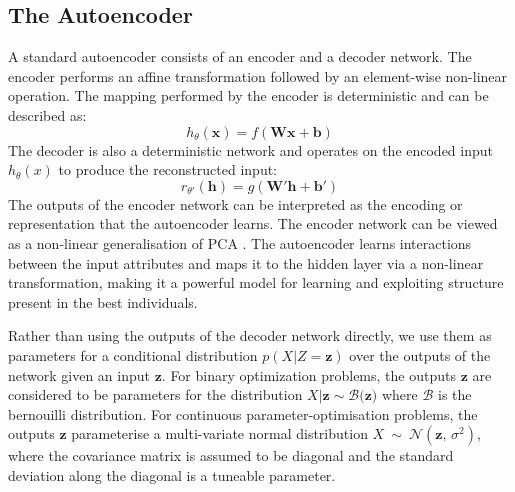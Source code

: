 \documentclass[twoside]{article}
\begin{document}

\subsection{The Autoencoder}


A standard autoencoder consists of an encoder and a decoder network. The encoder performs an affine transformation followed by an element-wise non-linear operation. The mapping performed by the encoder is deterministic and can be described as: $$h_{\theta}(\mathbf{x}) = f(\mathbf{Wx + b})$$ The decoder is also a deterministic network and operates on the encoded input $h_{\theta}(x)$ to produce the reconstructed input: $$ r_{\theta'}(\mathbf{h}) = g(\mathbf{W'h + b'})$$ The outputs of the encoder network can be interpreted as the encoding or representation that the autoencoder learns. The encoder network can be viewed as a non-linear generalisation of PCA \cite{hinton2006reducing}. The autoencoder learns interactions between the input attributes and maps it to the hidden layer via a non-linear transformation, making it a powerful model for learning and exploiting structure present in the best individuals.

Rather than using the outputs of the decoder network directly, we use them as parameters for a conditional distribution $p(X|Z=\mathbf{z})$ over the outputs of the network given an input $\mathbf{z}$. For binary optimization problems, the outputs $\mathbf{z}$ are considered to be parameters for the distribution $X|\mathbf{z} \sim \mathcal{B(\mathbf{z}})$ where $\mathcal{B}$ is the bernouilli distribution. For continuous parameter-optimisation problems, the outputs $\mathbf z$ parameterise a multi-variate normal distribution $X\ \sim\ \mathcal{N}(\mathbf{z},\,\sigma^2)$, where the covariance matrix is assumed to be diagonal and the standard deviation along the diagonal is a tuneable parameter.
\end{document}
